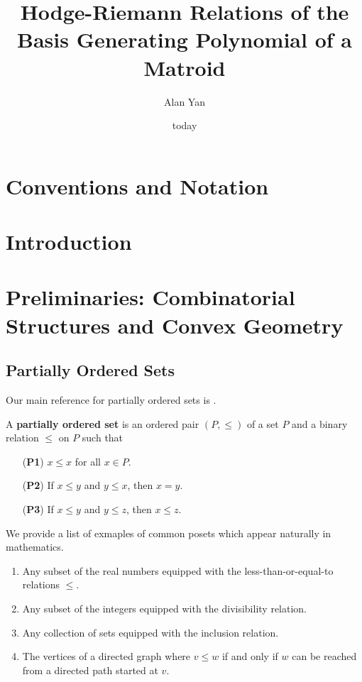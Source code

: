 \documentclass{puthesis-UG}
\author{Alan Yan}
\title{Hodge-Riemann Relations of the Basis Generating Polynomial of a Matroid}
\date{today}
\begin{document}
 
\chapter{Conventions and Notation}

\chapter{Introduction}

\chapter{Preliminaries: Combinatorial Structures and Convex Geometry}

\section{Partially Ordered Sets}

Our main reference for partially ordered sets is \cite{ordered-sets}. 
\begin{defn}
	A \textbf{partially ordered set} is an ordered pair $(P, \leq)$ of a set $P$ and a binary relation $\leq$ on $P$ such that 
	\begin{enumerate}
		\item[(\textbf{P1})] $x \leq x$ for all $x \in P$. 
		\item[(\textbf{P2})] If $x \leq y$ and $y \leq x$, then $x = y$. 
		\item[(\textbf{P3})] If $x \leq y$ and $y \leq z$, then $x \leq z$. 
	\end{enumerate}
\end{defn}

\begin{example}
	We provide a list of exmaples of common posets which appear naturally in mathematics. 
	\begin{enumerate}[label = (\alph*)]
		\item Any subset of the real numbers equipped with the less-than-or-equal-to relations $\leq$.
		\item Any subset of the integers equipped with the divisibility relation.
		\item Any collection of sets equipped with the inclusion relation. 
		\item The vertices of a directed graph where $v \leq w$ if and only if $w$ can be reached from a directed path started at $v$. 
	\end{enumerate}
\end{example}
\end{document}
